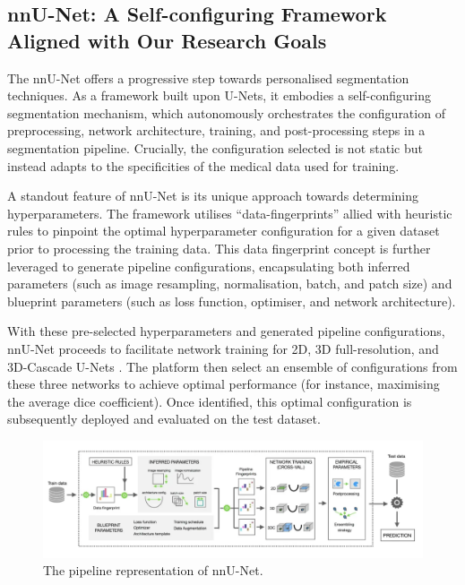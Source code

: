 \subsection{nnU-Net: A Self-configuring Framework Aligned with Our Research Goals}
The nnU-Net \cite{isensee2021nnu} offers a progressive step towards personalised segmentation techniques. As a framework built upon U-Nets, it embodies a self-configuring segmentation mechanism, which autonomously orchestrates the configuration of preprocessing, network architecture, training, and post-processing steps in a segmentation pipeline. Crucially, the configuration selected is not static but instead adapts to the specificities of the medical data used for training. 

A standout feature of nnU-Net is its unique approach towards determining hyperparameters. The framework utilises “data-fingerprints” allied with heuristic rules to pinpoint the optimal hyperparameter configuration for a given dataset prior to processing the training data. This data fingerprint concept is further leveraged to generate pipeline configurations, encapsulating both inferred parameters (such as image resampling, normalisation, batch, and patch size) and blueprint parameters (such as loss function, optimiser, and network architecture).

With these pre-selected hyperparameters and generated pipeline configurations, nnU-Net proceeds to facilitate network training for 2D, 3D full-resolution, and 3D-Cascade U-Nets \cite{isensee2018nnu}. The platform then select an ensemble of configurations from these three networks to achieve optimal performance (for instance, maximising the average dice coefficient). Once identified, this optimal configuration is subsequently deployed and evaluated on the test dataset.

\begin{figure}[htp]
    \centering
    \includegraphics[width=\textwidth]{./figures/nnunet.png}
    \caption{The pipeline representation of nnU-Net.}
    \label{fig:nnu-net}
\end{figure}

